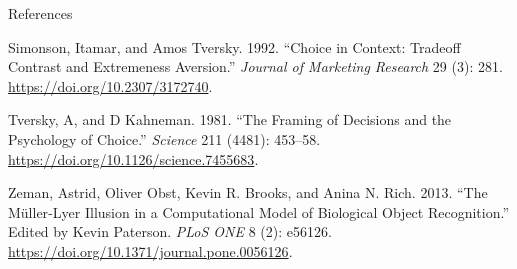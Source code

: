 \documentclass[
  ignorenonframetext,
]{beamer}
\newlength{\cslhangindent}
\newenvironment{CSLReferences}[2] %
 {\begin{list}{}{%
  \setlength{\itemindent}{0pt}
  \setlength{\leftmargin}{0pt}
  \setlength{\parsep}{0pt}
  \ifodd #1
   \setlength{\leftmargin}{\cslhangindent}
   \setlength{\itemindent}{-1\cslhangindent}
  \fi
  \setlength{\itemsep}{#2\baselineskip}}}
 {\end{list}}
\begin{document}
\begin{frame}[allowframebreaks]{References}
\begin{CSLReferences}{1}{0}
Simonson, Itamar, and Amos Tversky. 1992. {``Choice in {Context}:
{Tradeoff} {Contrast} and {Extremeness} {Aversion}.''} \emph{Journal of
Marketing Research} 29 (3): 281. \url{https://doi.org/10.2307/3172740}.

Tversky, A, and D Kahneman. 1981. {``The Framing of Decisions and the
Psychology of Choice.''} \emph{Science} 211 (4481): 453--58.
\url{https://doi.org/10.1126/science.7455683}.

Zeman, Astrid, Oliver Obst, Kevin R. Brooks, and Anina N. Rich. 2013.
{``The {Müller}-{Lyer} {Illusion} in a {Computational} {Model} of
{Biological} {Object} {Recognition}.''} Edited by Kevin Paterson.
\emph{PLoS ONE} 8 (2): e56126.
\url{https://doi.org/10.1371/journal.pone.0056126}.

\end{CSLReferences}
\end{frame}
\end{document}
